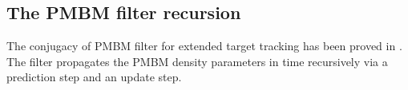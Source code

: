 
\subsection{The PMBM filter recursion}
The conjugacy of PMBM filter for extended target tracking has been proved in \cite{pmbmextended2}. The filter propagates the PMBM density parameters in time recursively via a prediction step and an update step. 


